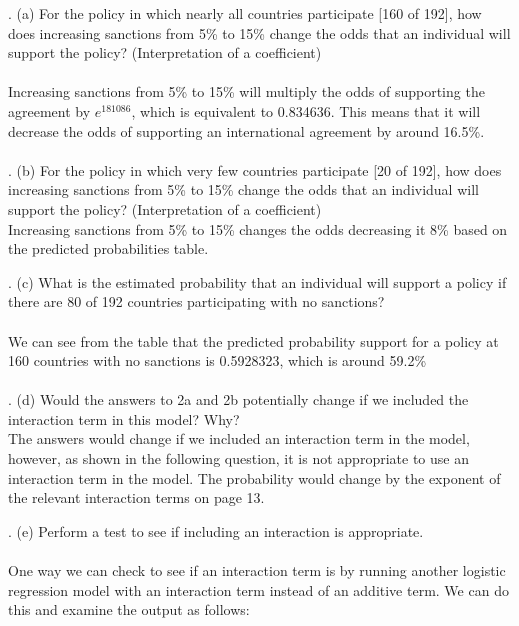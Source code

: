 \documentclass[12pt,letterpaper]{article}
\begin{document}
. (a) For the policy in which nearly all countries participate [160 of 192], how does increasing sanctions from 5\% to 15\% change the odds that an individual will support the policy? (Interpretation of a coefficient)
\\\\
\noindent Increasing sanctions from 5\% to 15\% will multiply the odds of supporting the agreement by $e^181086$, which is equivalent to 0.834636. This means that it will decrease the odds of supporting an international agreement by around 16.5\%.
\\\\

. (b) For the policy in which very few countries participate [20 of 192], how does increasing sanctions from 5\% to 15\% change the odds that an individual will support the policy? (Interpretation of a coefficient)
\\
\noindent 
Increasing sanctions from 5\% to 15\% changes the odds decreasing it 8\% based on the predicted probabilities table.

\newpage
{}. (c) What is the estimated probability that an individual will support a policy if there are 80 of 192 countries participating with no sanctions? 
\\\\

\noindent
We can see from the table that the predicted probability support for a policy at 160 countries with no sanctions is 0.5928323, which is around 59.2\%
\\\\
\newpage
{}. (d) Would the answers to 2a and 2b potentially change if we included the interaction term in this model? Why? 
\\
\noindent The answers would change if we included an interaction term in the model, however, as shown in the following question, it is not appropriate to use an interaction term in the model. The probability would change by the exponent of the relevant interaction terms on page 13.

\newpage
{}. (e) Perform a test to see if including an interaction is appropriate.
\\
\noindent 
\\
One way we can check to see if an interaction term is by running another logistic regression model with an interaction term instead of an additive term. We can do this and examine the output as follows:
\end{document}
